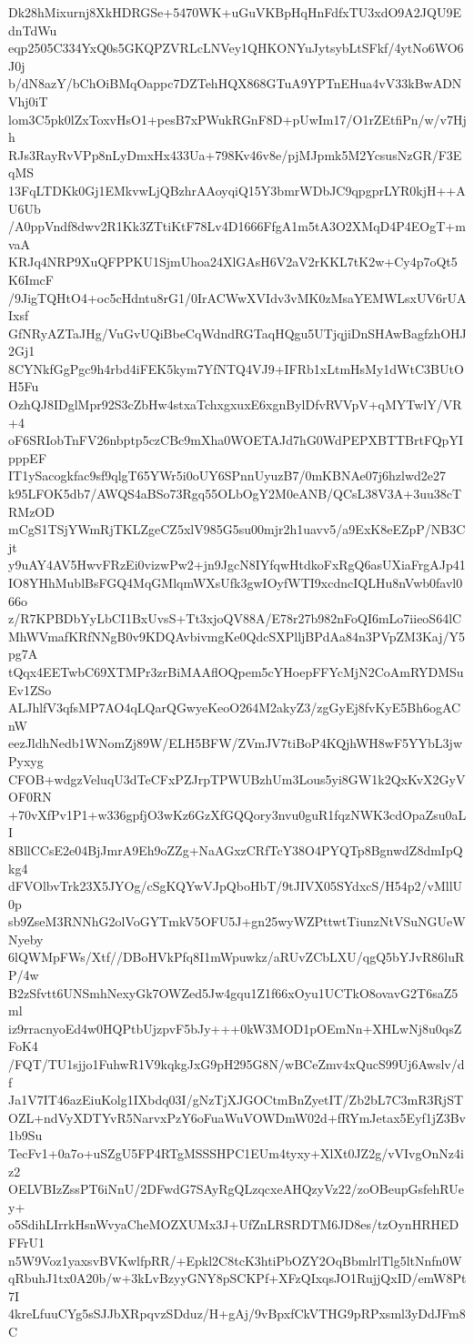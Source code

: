 Dk28hMixurnj8XkHDRGSe+5470WK+uGuVKBpHqHnFdfxTU3xdO9A2JQU9EdnTdWu
eqp2505C334YxQ0s5GKQPZVRLcLNVey1QHKONYuJytsybLtSFkf/4ytNo6WO6J0j
b/dN8azY/bChOiBMqOappc7DZTehHQX868GTuA9YPTnEHua4vV33kBwADNVhj0iT
lom3C5pk0lZxToxvHsO1+pesB7xPWukRGnF8D+pUwIm17/O1rZEtfiPn/w/v7Hjh
RJs3RayRvVPp8nLyDmxHx433Ua+798Kv46v8e/pjMJpmk5M2YcsusNzGR/F3EqMS
13FqLTDKk0Gj1EMkvwLjQBzhrAAoyqiQ15Y3bmrWDbJC9qpgprLYR0kjH++AU6Ub
/A0ppVndf8dwv2R1Kk3ZTtiKtF78Lv4D1666FfgA1m5tA3O2XMqD4P4EOgT+mvaA
KRJq4NRP9XuQFPPKU1SjmUhoa24XlGAsH6V2aV2rKKL7tK2w+Cy4p7oQt5K6ImcF
/9JigTQHtO4+oc5cHdntu8rG1/0IrACWwXVIdv3vMK0zMsaYEMWLsxUV6rUAIxsf
GfNRyAZTaJHg/VuGvUQiBbeCqWdndRGTaqHQgu5UTjqjiDnSHAwBagfzhOHJ2Gj1
8CYNkfGgPgc9h4rbd4iFEK5kym7YfNTQ4VJ9+IFRb1xLtmHsMy1dWtC3BUtOH5Fu
OzhQJ8IDglMpr92S3cZbHw4stxaTchxgxuxE6xgnBylDfvRVVpV+qMYTwlY/VR+4
oF6SRIobTnFV26nbptp5czCBc9mXha0WOETAJd7hG0WdPEPXBTTBrtFQpYIpppEF
IT1ySacogkfac9sf9qlgT65YWr5i0oUY6SPnnUyuzB7/0mKBNAe07j6hzlwd2e27
k95LFOK5db7/AWQS4aBSo73Rgq55OLbOgY2M0eANB/QCsL38V3A+3uu38cTRMzOD
mCgS1TSjYWmRjTKLZgeCZ5xlV985G5su00mjr2h1uavv5/a9ExK8eEZpP/NB3Cjt
y9uAY4AV5HwvFRzEi0vizwPw2+jn9JgcN8IYfqwHtdkoFxRgQ6asUXiaFrgAJp41
IO8YHhMublBsFGQ4MqGMlqmWXsUfk3gwIOyfWTI9xcdncIQLHu8nVwb0favl066o
z/R7KPBDbYyLbCI1BxUvsS+Tt3xjoQV88A/E78r27b982nFoQI6mLo7iieoS64lC
MhWVmafKRfNNgB0v9KDQAvbivmgKe0QdcSXPlljBPdAa84n3PVpZM3Kaj/Y5pg7A
tQqx4EETwbC69XTMPr3zrBiMAAflOQpem5cYHoepFFYcMjN2CoAmRYDMSuEv1ZSo
ALJhlfV3qfsMP7AO4qLQarQGwyeKeoO264M2akyZ3/zgGyEj8fvKyE5Bh6ogACnW
eezJldhNedb1WNomZj89W/ELH5BFW/ZVmJV7tiBoP4KQjhWH8wF5YYbL3jwPyxyg
CFOB+wdgzVeluqU3dTeCFxPZJrpTPWUBzhUm3Lous5yi8GW1k2QxKvX2GyVOF0RN
+70vXfPv1P1+w336gpfjO3wKz6GzXfGQQory3nvu0guR1fqzNWK3cdOpaZsu0aLI
8BllCCsE2e04BjJmrA9Eh9oZZg+NaAGxzCRfTcY38O4PYQTp8BgnwdZ8dmIpQkg4
dFVOlbvTrk23X5JYOg/cSgKQYwVJpQboHbT/9tJIVX05SYdxcS/H54p2/vMllU0p
sb9ZseM3RNNhG2olVoGYTmkV5OFU5J+gn25wyWZPttwtTiunzNtVSuNGUeWNyeby
6lQWMpFWs/Xtf//DBoHVkPfq8I1mWpuwkz/aRUvZCbLXU/qgQ5bYJvR86luRP/4w
B2zSfvtt6UNSmhNexyGk7OWZed5Jw4gqu1Z1f66xOyu1UCTkO8ovavG2T6saZ5ml
iz9rracnyoEd4w0HQPtbUjzpvF5bJy+++0kW3MOD1pOEmNn+XHLwNj8u0qsZFoK4
/FQT/TU1sjjo1FuhwR1V9kqkgJxG9pH295G8N/wBCeZmv4xQucS99Uj6Awslv/df
Ja1V7IT46azEiuKolg1IXbdq03I/gNzTjXJGOCtmBnZyetIT/Zb2bL7C3mR3RjST
OZL+ndVyXDTYvR5NarvxPzY6oFuaWuVOWDmW02d+fRYmJetax5Eyf1jZ3Bv1b9Su
TecFv1+0a7o+uSZgU5FP4RTgMSSSHPC1EUm4tyxy+XlXt0JZ2g/vVIvgOnNz4iz2
OELVBIzZssPT6iNnU/2DFwdG7SAyRgQLzqcxeAHQzyVz22/zoOBeupGsfehRUey+
o5SdihLIrrkHsnWvyaCheMOZXUMx3J+UfZnLRSRDTM6JD8es/tzOynHRHEDFFrU1
n5W9Voz1yaxsvBVKwlfpRR/+Epkl2C8tcK3htiPbOZY2OqBbmlrlTlg5ltNnfn0W
qRbuhJ1tx0A20b/w+3kLvBzyyGNY8pSCKPf+XFzQIxqsJO1RujjQxID/emW8Pt7I
4kreLfuuCYg5sSJJbXRpqvzSDduz/H+gAj/9vBpxfCkVTHG9pRPxsml3yDdJFm8C
